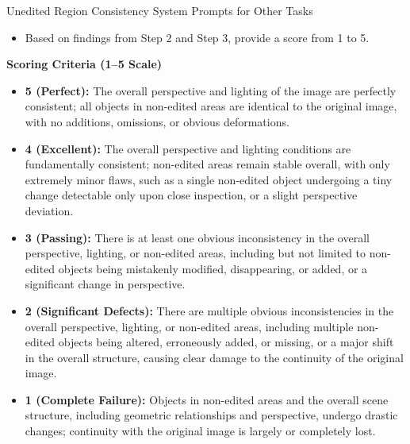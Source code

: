 \documentclass{llmxive}
\begin{document}
\begin{promptbox}[label={System Prompts: URC_Other_Tasks}]{Unedited Region Consistency System Prompts for Other Tasks}
\begin{itemize}[leftmargin=2.2em, labelsep=0.5em, itemsep=2pt]
    \begin{itemize}[leftmargin=2.2em, labelsep=0.5em, itemsep=2pt]
        \item \textbf{Spatial Structure Consistency:} Apart from the instruction's requirements, have the positions of objects changed?
        
        \item \textbf{Viewpoint Consistency:} Check if the view or angle of the Edited Image remains consistent.
    \end{itemize}
    
    \item Based on findings from Step 2 and Step 3, provide a score from 1 to 5.
\end{itemize}

\medskip

\textbf{Scoring Criteria (1--5 Scale)}

\begin{itemize}[leftmargin=2.2em, labelsep=0.5em, itemsep=2pt]
    \item \textbf{5 (Perfect):} The overall perspective and lighting of the image are perfectly consistent; all objects in non-edited areas are identical to the original image, with no additions, omissions, or obvious deformations.
    
    \item \textbf{4 (Excellent):} The overall perspective and lighting conditions are fundamentally consistent; non-edited areas remain stable overall, with only extremely minor flaws, such as a single non-edited object undergoing a tiny change detectable only upon close inspection, or a slight perspective deviation.
    
    \item \textbf{3 (Passing):} There is at least one obvious inconsistency in the overall perspective, lighting, or non-edited areas, including but not limited to non-edited objects being mistakenly modified, disappearing, or added, or a significant change in perspective.
    
    \item \textbf{2 (Significant Defects):} There are multiple obvious inconsistencies in the overall perspective, lighting, or non-edited areas, including multiple non-edited objects being altered, erroneously added, or missing, or a major shift in the overall structure, causing clear damage to the continuity of the original image.
    
    \item \textbf{1 (Complete Failure):} Objects in non-edited areas and the overall scene structure, including geometric relationships and perspective, undergo drastic changes; continuity with the original image is largely or completely lost.
\end{itemize}


\end{promptbox}
\end{document}

